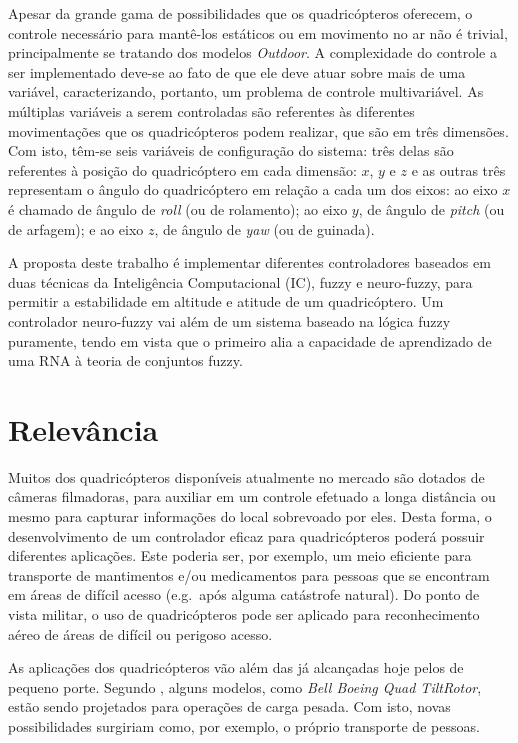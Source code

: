 Apesar da grande gama de possibilidades que os quadricópteros oferecem, o controle necessário para mantê-los estáticos ou em movimento no ar não é trivial, principalmente  se tratando dos modelos \textit{Outdoor}. A complexidade do controle a ser implementado deve-se ao fato de que ele deve atuar sobre mais de uma variável, caracterizando, portanto, um problema de controle multivariável. As múltiplas variáveis a serem controladas são referentes às diferentes movimentações que os quadricópteros podem realizar, que são em três dimensões. Com isto, têm-se seis variáveis de configuração do sistema: três delas são referentes à posição do quadricóptero em cada dimensão: $x$, $y$ e $z$ e as outras três representam o ângulo do quadricóptero em relação a cada um dos eixos: ao eixo $x$ é chamado de ângulo de \textit{roll} (ou de rolamento); ao eixo $y$, de ângulo de \textit{pitch} (ou de arfagem); e ao eixo $z$, de ângulo de \textit{yaw} (ou de guinada).

A proposta deste trabalho é implementar diferentes controladores baseados em duas técnicas da Inteligência Computacional (IC), fuzzy e neuro-fuzzy, para permitir a estabilidade em altitude e atitude de um quadricóptero. Um controlador neuro-fuzzy vai além de um sistema baseado na lógica fuzzy puramente, tendo em vista que o primeiro alia a capacidade de aprendizado de uma RNA à teoria de conjuntos fuzzy.

\section{Relevância}
\label{sec:relevancia}

Muitos dos quadricópteros disponíveis atualmente no mercado são dotados de câmeras filmadoras, para auxiliar em um controle efetuado a longa distância ou mesmo para capturar informações do local sobrevoado por eles. Desta forma, o desenvolvimento de um controlador eficaz para quadricópteros poderá possuir diferentes aplicações. Este poderia ser, por exemplo, um meio eficiente para transporte de mantimentos e/ou medicamentos para pessoas que se encontram em áreas de difícil acesso (e.g.\ após alguma catástrofe natural). Do ponto de vista militar, o uso de quadricópteros pode ser aplicado para reconhecimento aéreo de áreas de difícil ou perigoso acesso.

As aplicações dos quadricópteros vão além das já alcançadas hoje pelos de pequeno porte. Segundo , alguns modelos, como \textit{Bell Boeing Quad TiltRotor}, estão sendo projetados para operações de carga pesada. Com isto, novas possibilidades surgiriam como, por exemplo, o próprio transporte de pessoas.

